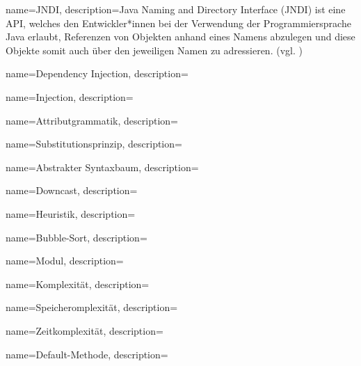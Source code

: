 {
    name=JNDI,
    description={Java Naming and Directory Interface (JNDI) ist eine API, welches den Entwickler*innen bei der Verwendung der Programmiersprache Java erlaubt, Referenzen von Objekten anhand eines Namens abzulegen und diese Objekte somit auch über den jeweiligen Namen zu adressieren. (vgl. \cite{jndi})}
}

{
    name=Dependency Injection,
    description={}
}

{
    name=Injection,
    description={}
}

{
    name=Attributgrammatik,
    description={}
}

{
    name=Substitutionsprinzip,
    description={}
}



{
    name=Abstrakter Syntaxbaum,
    description={}
}

{
    name=Downcast,
    description={}
}

{
    name=Heuristik,
    description={}
}

{
    name=Bubble-Sort,
    description={}
}

{
    name=Modul,
    description={}
}

{
    name=Komplexität,
    description={}
}


{
    name=Speicheromplexität,
    description={}
}


{
    name=Zeitkomplexität,
    description={}
}

{
    name=Default-Methode,
    description={}
}
